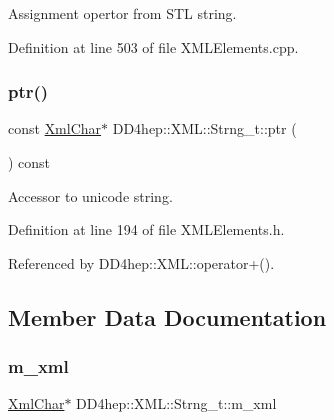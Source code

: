 Assignment opertor from S\+TL string. 



Definition at line 503 of file X\+M\+L\+Elements.\+cpp.

\hypertarget{class_d_d4hep_1_1_x_m_l_1_1_strng__t_a67fce43bb47154ceffbae6b63746ba58}{}\label{class_d_d4hep_1_1_x_m_l_1_1_strng__t_a67fce43bb47154ceffbae6b63746ba58} 
\subsubsection{\texorpdfstring{ptr()}{ptr()}}
{\footnotesize\ttfamily const \hyperlink{namespace_d_d4hep_1_1_x_m_l_a09e5d9cc86ed782f6826dfe0778c1815}{Xml\+Char}$\ast$ D\+D4hep\+::\+X\+M\+L\+::\+Strng\+\_\+t\+::ptr (\begin{DoxyParamCaption}{ }\end{DoxyParamCaption}) const\hspace{0.3cm}{\ttfamily [inline]}}



Accessor to unicode string. 



Definition at line 194 of file X\+M\+L\+Elements.\+h.



Referenced by D\+D4hep\+::\+X\+M\+L\+::operator+().



\subsection{Member Data Documentation}
\hypertarget{class_d_d4hep_1_1_x_m_l_1_1_strng__t_a09fc5214cd993d1c0a7678c5a85850a8}{}\label{class_d_d4hep_1_1_x_m_l_1_1_strng__t_a09fc5214cd993d1c0a7678c5a85850a8} 
\subsubsection{\texorpdfstring{m\+\_\+xml}{m\_xml}}
{\footnotesize\ttfamily \hyperlink{namespace_d_d4hep_1_1_x_m_l_a09e5d9cc86ed782f6826dfe0778c1815}{Xml\+Char}$\ast$ D\+D4hep\+::\+X\+M\+L\+::\+Strng\+\_\+t\+::m\+\_\+xml}



